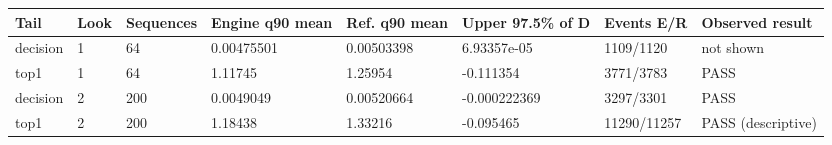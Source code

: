 \begin{tabular}{llllllll}
\toprule
Tail & Look & Sequences & Engine q90 mean & Ref. q90 mean & Upper 97.5\% of D & Events E/R & Observed result \\
\midrule
decision & 1 & 64 & 0.00475501 & 0.00503398 & 6.93357e-05 & 1109/1120 & not shown \\
top1 & 1 & 64 & 1.11745 & 1.25954 & -0.111354 & 3771/3783 & PASS \\
decision & 2 & 200 & 0.0049049 & 0.00520664 & -0.000222369 & 3297/3301 & PASS \\
top1 & 2 & 200 & 1.18438 & 1.33216 & -0.095465 & 11290/11257 & PASS (descriptive) \\
\bottomrule
\end{tabular}
